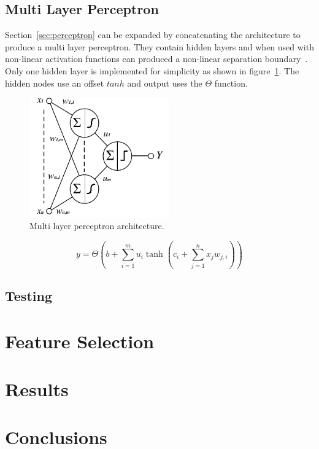 \documentclass{ecsarticle}     %
\begin{document}
\subsection{Multi Layer Perceptron}
Section~\ref{sec:perceptron} can be expanded by concatenating the architecture to produce a multi layer perceptron.
They contain hidden layers and when used with non-linear activation functions can produced a non-linear separation boundary~\citep{bennett01ml}.
Only one hidden layer is implemented for simplicity as shown in figure~\ref{fig:mlp}.
The hidden nodes use an offset $tanh$ and output uses the $\Theta$ function.


\begin{figure}[ht]
   \centering
    \includegraphics[width = 6cm]{MLP.pdf}
   \caption{Multi layer perceptron architecture.}
   \label{fig:mlp}
\end{figure}

\begin{equation}
   y = \Theta \left(b + \sum_{i=1}^{m} u_i \tanh \left(c_i + \sum_{j=1}^{n} x_j w_{j,i}\right)  \right) 
   \label{eqn:mlp}
\end{equation}




\subsection{Testing}




\section{Feature Selection}

\section{Results}

\section{Conclusions}
\end{document}
